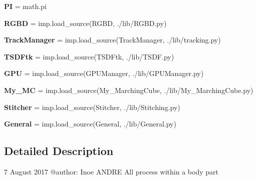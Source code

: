 \begin{DoxyCompactItemize}
\item 
\mbox{\label{namespace_body_parts_a1ab698cf581ff3eb738d64017cb23710}} 
{\bfseries PI} = math.\+pi
\item 
\mbox{\label{namespace_body_parts_ad3cd6431ffd8e5ec138606939797bc27}} 
{\bfseries R\+G\+BD} = imp.\+load\+\_\+source(\textquotesingle{}R\+G\+BD\textquotesingle{}, \textquotesingle{}./lib/R\+G\+B\+D.\+py\textquotesingle{})
\item 
\mbox{\label{namespace_body_parts_aedf6f63744d6b69484e16917c5cb01af}} 
{\bfseries Track\+Manager} = imp.\+load\+\_\+source(\textquotesingle{}Track\+Manager\textquotesingle{}, \textquotesingle{}./lib/tracking.\+py\textquotesingle{})
\item 
\mbox{\label{namespace_body_parts_a0a616cd1ce4a62524bf5d9d748c85f2b}} 
{\bfseries T\+S\+D\+Ftk} = imp.\+load\+\_\+source(\textquotesingle{}T\+S\+D\+Ftk\textquotesingle{}, \textquotesingle{}./lib/T\+S\+D\+F.\+py\textquotesingle{})
\item 
\mbox{\label{namespace_body_parts_ab2dda25c9906c074315d122cef6f94bd}} 
{\bfseries G\+PU} = imp.\+load\+\_\+source(\textquotesingle{}G\+P\+U\+Manager\textquotesingle{}, \textquotesingle{}./lib/G\+P\+U\+Manager.\+py\textquotesingle{})
\item 
\mbox{\label{namespace_body_parts_a6ee768ac808c89ad55a704afe5b4c8b5}} 
{\bfseries My\+\_\+\+MC} = imp.\+load\+\_\+source(\textquotesingle{}My\+\_\+\+Marching\+Cube\textquotesingle{}, \textquotesingle{}./lib/My\+\_\+\+Marching\+Cube.\+py\textquotesingle{})
\item 
\mbox{\label{namespace_body_parts_a4e8d2910ecc9385c64b64376244e328a}} 
{\bfseries Stitcher} = imp.\+load\+\_\+source(\textquotesingle{}Stitcher\textquotesingle{}, \textquotesingle{}./lib/Stitching.\+py\textquotesingle{})
\item 
\mbox{\label{namespace_body_parts_a93bb019b61f671709645f46560d035ee}} 
{\bfseries General} = imp.\+load\+\_\+source(\textquotesingle{}General\textquotesingle{}, \textquotesingle{}./lib/General.\+py\textquotesingle{})
\end{DoxyCompactItemize}


\subsection{Detailed Description}
\begin{DoxyVerb}7 August 2017
@author: Inoe ANDRE
All process within a body part
\end{DoxyVerb}
 